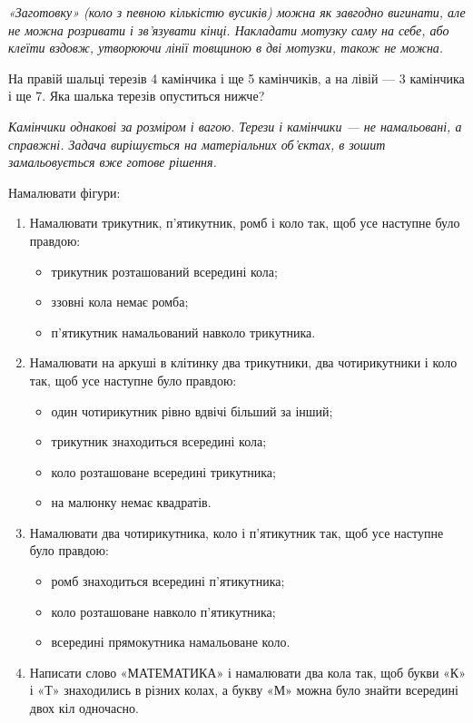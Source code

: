 \emph{
«Заготовку» (коло з певною кількістю вусиків) можна як завгодно вигинати,
але не можна розривати і зв'язувати кінці.
Накладати мотузку саму на себе, або клеїти вздовж,
утворюючи лінії товщиною в дві мотузки, також не можна.
}


\problem
На правій шальці терезів 4 камінчика і ще 5 камінчиків,
а на лівій --- 3 камінчика і ще 7.
Яка шалька терезів опуститься нижче? 

\emph{
Камінчики однакові за розміром і вагою.
Терези і камінчики --- не намальовані, а справжні.
Задача вирішується на матеріальних об’єктах,
в зошит замальовується вже готове рішення.
}


\problem
Намалювати фігури:
\begin{enumerate}
    \item Намалювати трикутник, п'ятикутник, ромб і коло так,
    щоб усе наступне було правдою:
    \begin{itemize}
        \item трикутник розташований всередині кола;
        \item ззовні кола немає ромба;
        \item п'ятикутник намальований навколо трикутника.
    \end{itemize}
    \item Намалювати на аркуші в клітинку два трикутники,
    два чотирикутники і коло так, щоб усе наступне було правдою:
    \begin{itemize}
        \item один чотирикутник рівно вдвічі більший за інший;
        \item трикутник знаходиться всередині кола;
        \item коло розташоване всередині трикутника;
        \item на малюнку немає квадратів.
    \end{itemize}
    \item Намалювати два чотирикутника, коло і п'ятикутник так,
    щоб усе наступне було правдою:
    \begin{itemize}
        \item ромб знаходиться всередині п'ятикутника;
        \item коло розташоване навколо п'ятикутника;
        \item всередині прямокутника намальоване коло.
    \end{itemize}
    \item Написати слово «МАТЕМАТИКА» і намалювати два кола так,
    щоб букви «К» і «Т» знаходились в різних колах,
    а букву «М» можна було знайти всередині двох кіл одночасно.
\end{enumerate}


